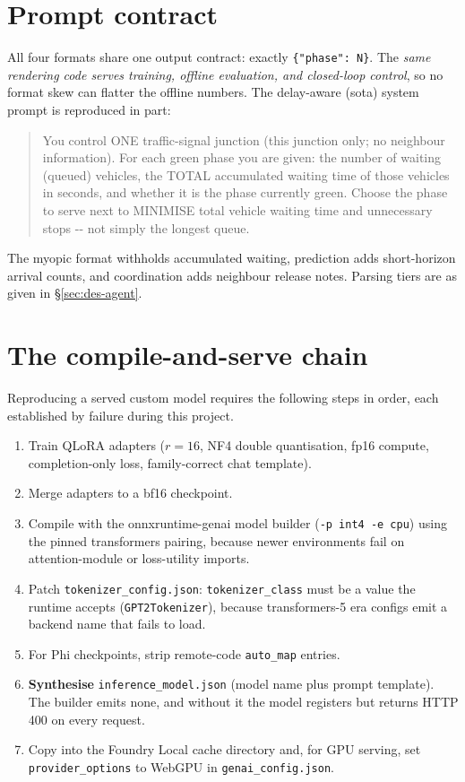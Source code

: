 \section{Prompt contract}
All four formats share one output contract: exactly
\texttt{\{"phase": N\}}. The \emph{same rendering code serves training,
offline evaluation, and closed-loop control}, so no format skew can
flatter the offline numbers. The delay-aware (sota) system prompt is
reproduced in part:

\begin{quote}\small\ttfamily\raggedright
You control ONE traffic-signal junction (this junction only; no neighbour
information). For each green phase you are given: the number of waiting
(queued) vehicles, the TOTAL accumulated waiting time of those vehicles in
seconds, and whether it is the phase currently green. Choose the phase to
serve next to MINIMISE total vehicle waiting time and unnecessary stops -{}-
not simply the longest queue.
\end{quote}

The myopic format withholds accumulated waiting, prediction adds
short-horizon arrival counts, and coordination adds neighbour release
notes. Parsing tiers are as given in \S\ref{sec:des-agent}.

\section{The compile-and-serve chain}
Reproducing a served custom model requires the following steps in order,
each established by failure during this project.

\begin{enumerate}
\item Train QLoRA adapters ($r{=}16$, NF4 double quantisation, fp16
compute, completion-only loss, family-correct chat template).
\item Merge adapters to a bf16 checkpoint.
\item Compile with the onnxruntime-genai model builder
(\texttt{-p int4 -e cpu}) using the pinned transformers pairing, because
newer environments fail on attention-module or loss-utility imports.
\item Patch \texttt{tokenizer\_config.json}: \texttt{tokenizer\_class}
must be a value the runtime accepts (\texttt{GPT2Tokenizer}), because
transformers-5 era configs emit a backend name that fails to load.
\item For Phi checkpoints, strip remote-code \texttt{auto\_map} entries.
\item \textbf{Synthesise} \texttt{inference\_model.json} (model name plus
prompt template). The builder emits none, and without it the model
registers but returns HTTP 400 on every request.
\item Copy into the Foundry Local cache directory and, for GPU serving,
set \texttt{provider\_options} to WebGPU in \texttt{genai\_config.json}.
\end{enumerate}

